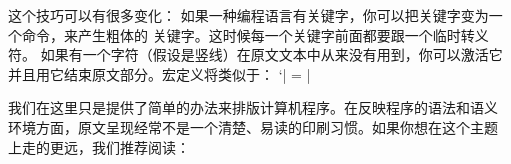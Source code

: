 这个技巧可以有很多变化：
\ulist
\li 如果一种编程语言有关键字，你可以把关键字变为一个命令，来产生粗体的
关键字。这时候每一个关键字前面都要跟一个临时转义符。
\li 如果有一个字符（假设是竖线）在原文文本中从来没有用到，你可以激活它
并且用它结束原文部分。宏定义将类似于：
\csdisplay
{\catcode `\!| = \active
\gdef\verbatim{%
   \par\begingroup\deactivate\obeywhitespace
   \catcode `!| = \active
   \def !|{\endgroup\par}%
}}
|
\endulist



我们在这里只是提供了简单的办法来排版计算机程序。在反映程序的语法和语义
环境方面，原文呈现经常不是一个清楚、易读的印刷习惯。如果你想在这个主题
上走的更远，我们推荐阅读：


